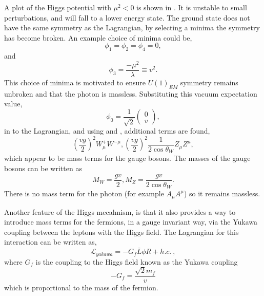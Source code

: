 A plot of the Higgs potential with $\mu^{2}<0$ is shown in
. It is unstable to small perturbations, and will fall
to a lower energy state. 
The ground state does not have the same symmetry as the Lagrangian, by
selecting a minima the symmetry has become broken. An example choice of minima
could be,
\begin{equation}
\phi_{1} = \phi_{2} = \phi_{4} = 0,
\end{equation}
and
\begin{equation}
\phi_{3} = \frac{-\mu^{2}}{\lambda} \equiv v^{2}.
\end{equation}
This choice of minima is motivated to ensure $U(1)_{EM}$ symmetry remains
unbroken and
that the photon is massless.
Substituting this vacuum expectation value,
\begin{equation}
\phi_{0} = \frac{1}{\sqrt{2}}\left(\begin{matrix}0\\v\end{matrix}\right),
\end{equation}
in to the Lagrangian, and using  and
, additional terms are found\cite{},
\begin{equation}
\left(\frac{vg}{2}\right)^{2} W^{+}_{\mu} W^{- \mu}, 
\left(\frac{vg}{2}\right)^{2} \frac{1}{2\cos\theta_{W}} Z_{\mu} Z^{\mu},
\end{equation}
which appear to be mass terms for the gauge bosons.
The masses of the gauge bosons can be written as 
\begin{equation}
M_{W} = \frac{gv}{2}, 
M_{Z} = \frac{gv}{2\cos\theta_{W}}.
\end{equation}
There is no mass term for the photon (for example $A_{\mu}A^{\mu}$) so it
remains massless.

Another feature of the Higgs mecahnism, is that it also provides a way to
introduce mass terms for the fermions, in a gauge invariant way, via the Yukawa
coupling between the leptons with the Higgs field. The Lagrangian for this
interaction can be written as, 
\begin{equation}
\mathcal{L}_{yakawa} = -G_{f}\bar{L}\phi R + h.c. \ ,
\end{equation}
where $G_{f}$ is the coupling to the Higgs field known as the Yukawa coupling
\begin{equation}
-G_{f} = \frac{\sqrt{2}m_{f}}{v}
\end{equation}
which is proportional to the mass of the fermion. 


